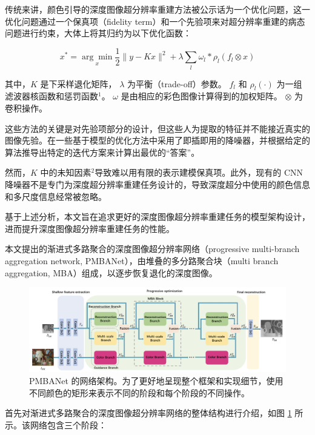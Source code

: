\documentclass{vip-theme}
\begin{document}
传统来讲，颜色引导的深度图像超分辨率重建方法被公示话为一个优化问题，这一优化问题通过一个保真项（fidelity term）和一个先验项来对超分辨率重建的病态问题进行约束，大体上将其归约为以下优化函数：

\begin{equation}
x^{*}=\underset{x}{\arg \min } \frac{1}{2}\|y-K x\|^{2}+\lambda \sum_{l} \omega_{l} * \rho_{l}\left(f_{l} \otimes x\right)
\end{equation}

其中，$K$ 是下采样退化矩阵， $\lambda$ 为平衡（trade-off）参数。 $f_l$ 和 $\rho_l(·)$ 为一组滤波器核函数和惩罚函数$^1$。 $\omega$ 是由相应的彩色图像计算得到的加权矩阵。 $\otimes$ 为卷积操作。

这些方法的关键是对先验项部分的设计，但这些人为提取的特征并不能接近真实的图像先验。在一些基于模型的优化方法中采用了即插即用的降噪器，并根据给定的算法推导出特定的迭代方案来计算出最优的“答案”。

然而，$K$ 中的未知因素$^2$导致难以用有限的表示建模保真项。此外，现有的 CNN 降噪器不是专门为深度超分辨率重建任务设计的，导致深度超分中使用的颜色信息和多尺度信息经常被忽略。

基于上述分析，本文旨在追求更好的深度图像超分辨率重建任务的模型架构设计，进而提升深度图像超分辨率重建任务的性能。

本文提出的渐进式多路聚合的深度图像超分辨率网络（progressive multi-branch aggregation network, PMBANet），由堆叠的多分路聚合块（multi branch aggregation, MBA）组成，以逐步恢复退化的深度图像。

\begin{figure}[!htbp]
\centering
	\includegraphics[width=.7\paperwidth]{figure/model.png}
	\caption{PMBANet 的网络架构。为了更好地呈现整个框架和实现细节，使用不同颜色的矩形来表示不同的阶段和每个阶段的不同操作。}
	\label{fig:model}
\end{figure}

首先对渐进式多路聚合的深度图像超分辨率网络的整体结构进行介绍，如图 \ref{fig:model} 所示。该网络包含三个阶段：
\end{document}
